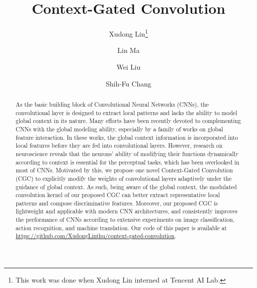 \documentclass[runningheads]{llncs}
\begin{document}
\pagestyle{headings}
\mainmatter
\def\ECCVSubNumber{3098}  

\title{Context-Gated Convolution} 

\authorrunning{ECCV-20 submission ID \ECCVSubNumber} 

\author{Xudong Lin\thanks{This work was done when Xudong Lin interned at Tencent AI Lab.} 
\and
Lin Ma
\and
Wei Liu
\and
Shih-Fu Chang
}




\maketitle

\begin{abstract}


As the basic building block of Convolutional Neural Networks (CNNs), the convolutional layer is designed to extract local patterns and lacks the ability to model global context in its nature. Many efforts have been recently devoted to complementing CNNs with the global modeling ability, especially by a family of works on global feature interaction. In these works, the global context information is incorporated into local features before they are fed into convolutional layers. However, research on neuroscience reveals that the neurons' ability of modifying their functions dynamically  according to context is essential for the perceptual tasks, which has been overlooked in most of CNNs. Motivated by this, we propose one novel Context-Gated Convolution (CGC) to explicitly modify the weights of convolutional layers adaptively under the guidance of global context. As such, being aware of the global context, the modulated convolution kernel of our proposed CGC can better extract representative local patterns and compose discriminative features. Moreover, our proposed CGC is lightweight and applicable with modern CNN architectures, and consistently improves the performance of CNNs according to extensive experiments on image classification, action recognition, and machine translation. Our code of this paper is available at \url{https://github.com/XudongLinthu/context-gated-convolution}.


\end{abstract}
\end{document}
